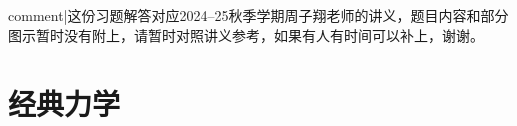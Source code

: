 \def\r{\boldsymbol{r}}
\def\v{\boldsymbol{v}}
\def\a{\boldsymbol{a}}
\def\p{\boldsymbol{p}}
\def\T{\boldsymbol{T}}
\def\N{\boldsymbol{N}}
\def\J{\boldsymbol{J}}
\def\q{\boldsymbol{q}}
\def\n{\boldsymbol{n}}
\def\f{\boldsymbol{f}}
{{comment|这份习题解答对应2024--25秋季学期周子翔老师的讲义，题目内容和部分图示暂时没有附上，请暂时对照讲义参考，如果有人有时间可以补上，谢谢。}}
\section{经典力学}
